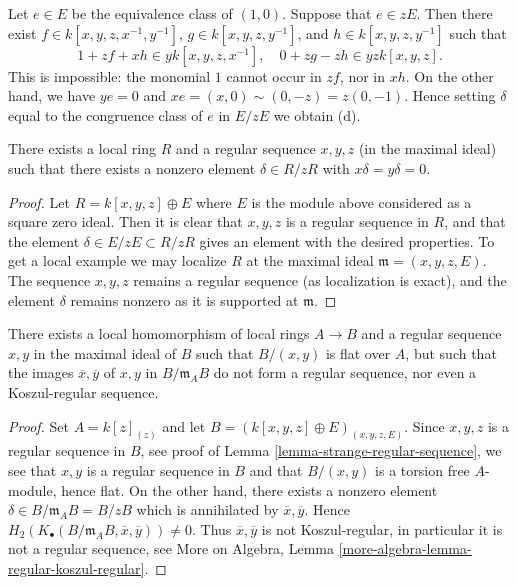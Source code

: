 \medskip\noindent
Let $e \in E$ be the equivalence class of $(1, 0)$.
Suppose that $e \in zE$. Then there exist $f \in k[x, y, z, x^{-1}, y^{-1}]$,
$g \in k[x, y, z, y^{-1}]$, and $h \in k[x, y, z, y^{-1}]$ such that
$$
1 + zf + xh \in yk[x, y, z, x^{-1}], \quad
0 + zg - zh \in yzk[x, y, z].
$$
This is impossible: the monomial $1$ cannot occur in
$zf$, nor in $xh$. On the other hand, we have $ye = 0$ and
$xe = (x, 0) \sim (0, -z) = z(0, -1)$. Hence setting $\delta$
equal to the congruence class of $e$ in $E/zE$ we obtain (d).

\begin{lemma}
\label{lemma-strange-regular-sequence}
There exists a local ring $R$ and a regular sequence $x, y, z$
(in the maximal ideal) such that there exists a nonzero element
$\delta \in R/zR$ with $x\delta = y\delta = 0$.
\end{lemma}

\begin{proof}
Let $R = k[x, y, z] \oplus E$ where $E$ is the module above considered
as a square zero ideal. Then it is clear that $x, y, z$ is a regular
sequence in $R$, and that the element $\delta \in E/zE \subset R/zR$
gives an element with the desired properties. To get a local example
we may localize $R$ at the maximal ideal $\mathfrak m = (x, y, z, E)$.
The sequence $x, y, z$ remains a regular sequence (as localization is
exact), and the element $\delta$ remains nonzero as it is supported
at $\mathfrak m$.
\end{proof}

\begin{lemma}
\label{lemma-base-change-regular-sequence}
There exists a local homomorphism of local rings $A \to B$
and a regular sequence $x, y$ in the maximal ideal of $B$ such that
$B/(x, y)$ is flat over $A$, but such that the images
$\overline{x}, \overline{y}$ of $x, y$ in $B/\mathfrak m_AB$ do not
form a regular sequence, nor even a Koszul-regular sequence.
\end{lemma}

\begin{proof}
Set $A = k[z]_{(z)}$ and let $B = (k[x, y, z] \oplus E)_{(x, y, z, E)}$.
Since $x, y, z$ is a regular sequence in $B$, see proof of
Lemma \ref{lemma-strange-regular-sequence},
we see that $x, y$ is a regular sequence in $B$ and that
$B/(x, y)$ is a torsion free $A$-module, hence flat.
On the other hand, there exists a nonzero element
$\delta \in B/\mathfrak m_AB = B/zB$ which is annihilated
by $\overline{x}, \overline{y}$. Hence
$H_2(K_\bullet(B/\mathfrak m_AB, \overline{x}, \overline{y})) \not = 0$.
Thus $\overline{x}, \overline{y}$ is not Koszul-regular, in particular
it is not a regular sequence, see
More on Algebra, Lemma \ref{more-algebra-lemma-regular-koszul-regular}.
\end{proof}





